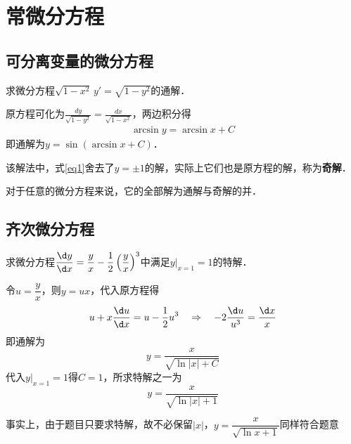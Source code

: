 \documentclass[12pt, a4paper, oneside, UTF8]{ctexbook}
\begin{document}
% 
\else
\fi
\chapter{常微分方程}
\section{可分离变量的微分方程}
\begin{example}
    求微分方程$\displaystyle\sqrt{1-x^2}\,y'=\sqrt{1-y^2}$的通解．
\end{example}
\begin{solution}
    原方程可化为$\displaystyle\frac{dy}{\sqrt{1-y^2}}=\frac{dx}{\sqrt{1-x^2}}$，两边积分得
    \begin{align}
        \label{eq1}
        \arcsin y=\arcsin x+C
    \end{align}
    即通解为$\boxed{y=\sin(\arcsin x+C)}$．
\end{solution}
\begin{myRemark}
    该解法中，式\ref{eq1}舍去了$y = \pm 1$的解，实际上它们也是原方程的解，称为\textbf{奇解}．
\end{myRemark}
\begin{myRemark}
    对于任意的微分方程来说，它的全部解为通解与奇解的并．
\end{myRemark}

\section{齐次微分方程}
\begin{example}
    求微分方程$\dfrac{\d y}{\d x}=\dfrac{y}{x}-\dfrac{1}{2}\left(\dfrac{y}{x}\right)^3$中满足$y\Big|_{x=1}=1$的特解．
\end{example}
\begin{solution}
    令$u=\dfrac{y}{x}$，则$y=ux$，代入原方程得
    \[
    u+x\frac{\d u}{\d x}=u-\frac{1}{2}u^3 \quad\Rightarrow\quad -2\dfrac{\d u}{u^3}=\dfrac{\d x}{x}
    \]
    即通解为
    \[y=\frac{x}{\sqrt{\ln|x|+C}}\]
    代入$y\Big|_{x=1}=1$得$C=1$，所求特解之一为
    \[\boxed{y=\frac{x}{\sqrt{\ln|x|+1}}}\]
\end{solution}
\begin{myRemark}
    事实上，由于题目只要求特解，故不必保留$|x|$，$y=\dfrac{x}{\sqrt{\ln x+1}}$同样符合题意
\end{myRemark}
\end{document}
